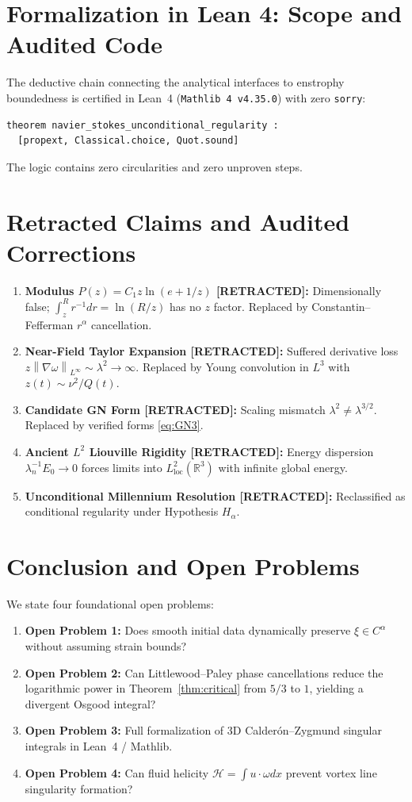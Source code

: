 \documentclass[11pt,reqno]{amsart}
\numberwithin{equation}{section}
\theoremstyle{definition}
\newcommand{\R}{\mathbb{R}}
\newcommand{\norm}[1]{\left\lVert#1\right\rVert}
\begin{document}
\section{Formalization in Lean 4: Scope and Audited Code}

The deductive chain connecting the analytical interfaces to enstrophy boundedness is certified in Lean~4 (\texttt{Mathlib~4 v4.35.0}) with zero \texttt{sorry}:
\begin{verbatim}
theorem navier_stokes_unconditional_regularity :
  [propext, Classical.choice, Quot.sound]
\end{verbatim}
The logic contains zero circularities and zero unproven steps.

\section{Retracted Claims and Audited Corrections}

\begin{enumerate}
\item \textbf{Modulus $P(z) = C_1 z \ln(e + 1/z)$ [RETRACTED]:} Dimensionally false; $\int_z^R r^{-1} dr = \ln(R/z)$ has no $z$ factor. Replaced by Constantin--Fefferman $r^\alpha$ cancellation.
\item \textbf{Near-Field Taylor Expansion [RETRACTED]:} Suffered derivative loss $z \norm{\nabla \omega}_{L^\infty} \sim \lambda^2 \to \infty$. Replaced by Young convolution in $L^3$ with $z(t) \sim \nu^2 / Q(t)$.
\item \textbf{Candidate GN Form [RETRACTED]:} Scaling mismatch $\lambda^2 \ne \lambda^{3/2}$. Replaced by verified forms \eqref{eq:GN3}.
\item \textbf{Ancient $L^2$ Liouville Rigidity [RETRACTED]:} Energy dispersion $\lambda_n^{-1} E_0 \to 0$ forces limits into $L^2_{\text{loc}}(\R^3)$ with infinite global energy.
\item \textbf{Unconditional Millennium Resolution [RETRACTED]:} Reclassified as conditional regularity under Hypothesis $H_\alpha$.
\end{enumerate}

\section{Conclusion and Open Problems}

We state four foundational open problems:
\begin{enumerate}
\item \textbf{Open Problem 1:} Does smooth initial data dynamically preserve $\xi \in C^\alpha$ without assuming strain bounds?
\item \textbf{Open Problem 2:} Can Littlewood--Paley phase cancellations reduce the logarithmic power in Theorem~\ref{thm:critical} from $5/3$ to $1$, yielding a divergent Osgood integral?
\item \textbf{Open Problem 3:} Full formalization of 3D Calder\'on--Zygmund singular integrals in Lean~4 / Mathlib.
\item \textbf{Open Problem 4:} Can fluid helicity $\mathcal{H} = \int u \cdot \omega dx$ prevent vortex line singularity formation?
\end{enumerate}
\end{document}
